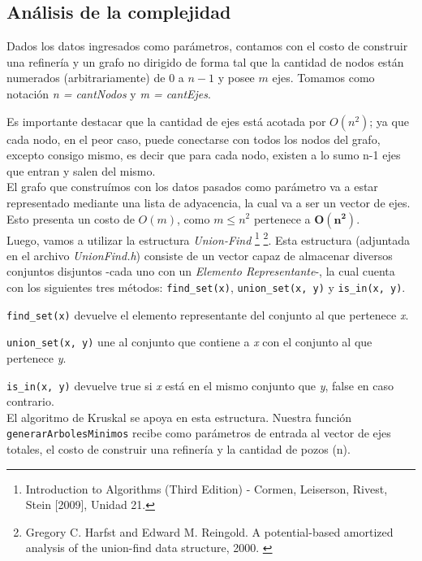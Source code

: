 \newpage
\subsection{An\'alisis de la complejidad}

Dados los datos ingresados como par\'ametros, contamos con el costo de construir una refiner\'ia y un grafo no dirigido de forma tal que la cantidad de nodos  est\'an numerados (arbitrariamente) de $0$ a $n-1$ y posee $m$ ejes. Tomamos como notaci\'on \emph{n = cantNodos} y \emph{m = cantEjes}.

Es importante destacar que la cantidad de ejes est\'a acotada por $O(n^2)$; ya que cada nodo, en el peor caso, puede conectarse con todos los nodos del grafo, excepto consigo mismo, es decir que para cada nodo, existen a lo sumo n-1 ejes que entran y salen del mismo.\\

El grafo que constru\'imos con los datos pasados como par\'ametro va a estar representado mediante una lista de adyacencia, la cual va a ser un vector de ejes. Esto presenta un costo de $O(m)$, como $m \leq n^2$ pertenece a $\mathbf{O(n^2)}$.\\

Luego, vamos a utilizar la estructura \emph{Union-Find} \footnote{Introduction to Algorithms (Third Edition) - Cormen, Leiserson, Rivest, Stein [2009], Unidad 21.} \footnote{Gregory C. Harfst and Edward M. Reingold. A potential-based amortized analysis of the
union-find data structure, 2000.	\label{paper}}. Esta estructura (adjuntada en el archivo \textit{UnionFind.h}) consiste de un vector capaz de almacenar diversos conjuntos disjuntos -cada uno con un \emph{Elemento Representante}-, la cual cuenta con los siguientes tres m\'etodos: \texttt{find_set(x)}, \texttt{union_set(x, y)} y \texttt{is_in(x, y)}. 

\texttt{find_set(x)} devuelve el elemento representante del conjunto al que pertenece \emph{x}.

\texttt{union_set(x, y)} une al conjunto que contiene a \emph{x} con el conjunto al que pertenece \emph{y}. 
 
\texttt{is_in(x, y)} devuelve true si \emph{x} est\'a en el mismo conjunto que \emph{y}, false en caso contrario. \\


El algoritmo de Kruskal se apoya en esta estructura. Nuestra funci\'on \texttt{generarArbolesMinimos} recibe como par\'ametros de entrada al vector de ejes totales, el costo de construir una refiner\'ia y la cantidad de pozos (n).


